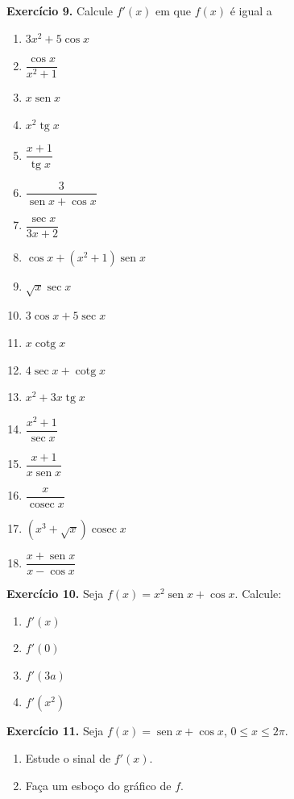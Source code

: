 \documentclass[12pt,a4paper]{article}
\begin{document}
\vspace{0.5cm}
\noindent\textbf{Exercício 9.} Calcule $f'(x)$ em que $f(x)$ é igual a
\begin{enumerate}
    \renewcommand{\theenumi}{\alph{enumi}}
    \renewcommand{\labelenumi}{\theenumi)}
    \item $3x^2 + 5\cos x$
    \item $\dfrac{\cos x}{x^2 + 1}$
    \item $x\operatorname{sen} x$
    \item $x^2 \operatorname{tg} x$
    \item $\dfrac{x + 1}{\operatorname{tg} x}$
    \item $\dfrac{3}{\operatorname{sen} x + \cos x}$
    \item $\dfrac{\sec x}{3x + 2}$
    \item $\cos x + (x^2 + 1)\operatorname{sen} x$
    \item $\sqrt{x}\sec x$
    \item $3\cos x + 5\sec x$
    \item $x\operatorname{cotg} x$
    \item $4\sec x + \operatorname{cotg} x$
    \item $x^2 + 3x\operatorname{tg} x$
    \item $\dfrac{x^2 + 1}{\sec x}$
    \item $\dfrac{x + 1}{x\operatorname{sen} x}$
    \item $\dfrac{x}{\operatorname{cosec} x}$
    \item $(x^3 + \sqrt{x})\operatorname{cosec} x$
    \item $\dfrac{x + \operatorname{sen} x}{x - \cos x}$
\end{enumerate}

\vspace{0.5cm}
\noindent\textbf{Exercício 10.} Seja $f(x) = x^2 \operatorname{sen} x + \cos x$. Calcule:
\begin{enumerate}
    \renewcommand{\theenumi}{\alph{enumi}}
    \renewcommand{\labelenumi}{\theenumi)}
    \item $f'(x)$
    \item $f'(0)$
    \item $f'(3a)$
    \item $f'(x^2)$
\end{enumerate}

\vspace{0.5cm}
\noindent\textbf{Exercício 11.} Seja $f(x) = \operatorname{sen} x + \cos x$, $0 \le x \le 2\pi$.
\begin{enumerate}
    \renewcommand{\theenumi}{\alph{enumi}}
    \renewcommand{\labelenumi}{\theenumi)}
    \item Estude o sinal de $f'(x)$.
    \item Faça um esboço do gráfico de $f$.
\end{enumerate}
\end{document}
